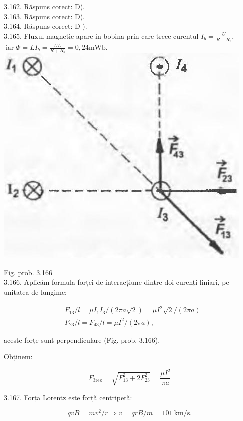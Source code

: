 \documentclass[10pt]{article}
\begin{document}
3.162. Răspuns corect: D).\\
3.163. Răspuns corect: D).\\
3.164. Răspuns corect: D ).\\
3.165. Fluxul magnetic apare in bobina prin care trece curentul $I_{b}=\frac{U}{R+R_{b}}$, $\operatorname{iar} \Phi=L I_{b}=\frac{U L}{R+R_{b}}=0,24 \mathrm{mWb}$.\\
\includegraphics[max width=\textwidth, center]{2025_07_01_5b3ff9fa0d508c8e9f17g-373}

Fig. prob. 3.166\\
3.166. Aplicăm formula forței de interacțiune dintre doi curenți liniari, pe unitatea de lungime:

$$
\begin{aligned}
& F_{13} / l=\mu I_{1} I_{3} /(2 \pi a \sqrt{2})=\mu I^{2} \sqrt{2} /(2 \pi a) \\
& F_{23} / l=F_{43} / l=\mu I^{2} /(2 \pi a),
\end{aligned}
$$

aceste forțe sunt perpendiculare (Fig. prob. 3.166).

Obținem:

$$
F_{3 \mathrm{rez}}=\sqrt{F_{13}^{2}+2 F_{23}^{2}}=\frac{\mu I^{2}}{\pi a}
$$

3.167. Forța Lorentz este forță centripetă:

$$
q v B=m v^{2} / r \Rightarrow v=q r B / m=101 \mathrm{~km} / \mathrm{s} .
$$
\end{document}
